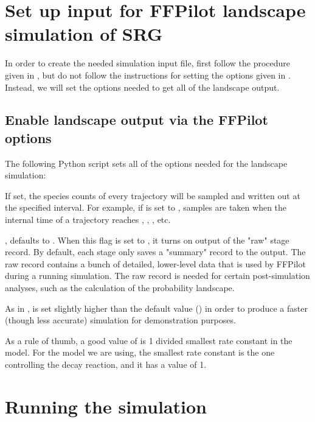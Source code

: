 \section{Set up input for FFPilot landscape simulation of SRG}

In order to create the needed simulation input file, first follow the procedure given in , but do not follow the instructions for setting the options given in . Instead, we will set the options needed to get all of the landscape output.

\subsection{Enable landscape output via the FFPilot options}
The following Python script sets all of the options needed for the landscape simulation:


\begin{description}[style=nextline]
    \item[\code{writeInterval}] If set, the species counts of every trajectory will be sampled and written out at the specified interval. For example, if  is set to , samples are taken when the internal time of a trajectory reaches , , , etc.
    \item[\code{ffluxStageOutputRaw}] , defaults to . When this flag is set to , it turns on output of the "raw" stage record. By default, each stage only saves a "summary" record to the output. The raw record contains a bunch of detailed, lower-level data that is used by FFPilot during a running simulation.  The raw record is needed for certain post-simulation analyses, such as the calculation of the probability landscape.
\end{description}
As in ,  is set slightly higher than the default value () in order to produce a faster (though less accurate) simulation for demonstration purposes.

As a rule of thumb, a good value of  is 1 divided smallest rate constant in the model. For the  model we are using, the smallest rate constant is the one controlling the decay reaction, and it has a value of 1.

\section{Running the simulation}

